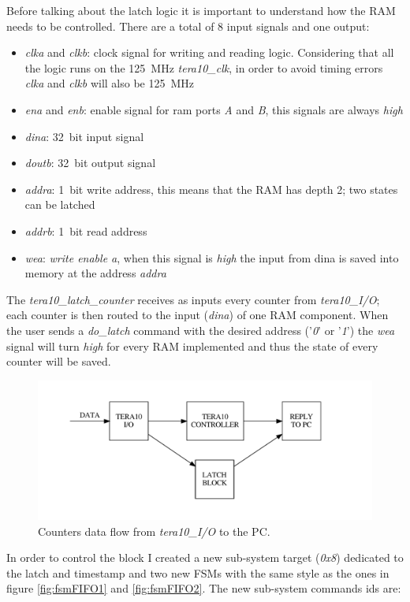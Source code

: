 \noindent Before talking about the latch logic it is important to understand how the RAM needs to be controlled. There are a total of 8 input signals and one output:
\begin{itemize}
	\item \textit{clka} and \textit{clkb}: clock signal for writing and reading logic. Considering that all the logic runs on the 125~MHz \textit{tera10\_clk}, in order to avoid timing errors \textit{clka} and \textit{clkb} will also be 125~MHz
	\item \textit{ena} and \textit{enb}: enable signal for ram ports \textit{A} and \textit{B}, this signals are always \textit{high}
	\item \textit{dina}: 32~bit input signal
	\item \textit{doutb}: 32~bit output signal
	\item \textit{addra}: 1~bit write address, this means that the RAM has depth 2; two states can be latched
	\item \textit{addrb}: 1~bit read address
	\item \textit{wea}: \textit{write enable a}, when this signal is \textit{high} the input from dina is saved into memory at the address \textit{addra}
\end{itemize} 
\noindent The \textit{tera10\_latch\_counter} receives as inputs every counter from \textit{tera10\_I/O}; each counter is then routed to the input (\textit{dina}) of one RAM component. When the user sends a \textit{do\_latch} command with the desired address ('\textit{0}' or '\textit{1}') the \textit{wea} signal will turn \textit{high} for every RAM implemented and thus the state of every counter will be saved.
\begin{figure}[H]
	\centering
	\includegraphics[width=0.7\linewidth]{FSMdiagrams/latch_counter.pdf}
	\caption{Counters data flow from \textit{tera10\_I/O} to the PC.}
	\label{fig:latch_counter}
\end{figure}
\noindent In order to control the block I created a new sub-system target (\textit{0x8}) dedicated to the latch and timestamp and two new FSMs with the same style as the ones in figure \ref{fig:fsmFIFO1} and \ref{fig:fsmFIFO2}. The new sub-system commands ids are:
